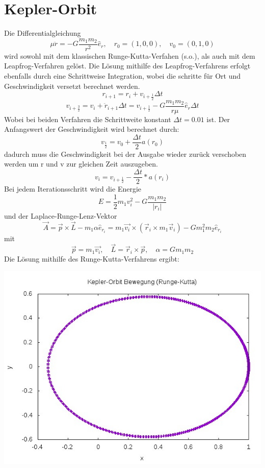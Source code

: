 \documentclass{scrreprt}
\begin{document}
\section*{Kepler-Orbit}
Die Differentialgleichung
\[
\mu \ddot{r}=-G\frac{m_1 m_2}{r^2}\hat{e}_r, \quad r_0 = (1,0,0), \quad v_0 = (0,1,0)
\]
wird sowohl mit dem klassischen Runge-Kutta-Verfahen (s.o.), als auch mit dem Leapfrog-Verfahren gelöst. Die Lösung mithilfe des Leapfrog-Verfahrens erfolgt ebenfalls durch eine Schrittweise Integration, wobei die schritte für Ort und Geschwindigkeit versetzt berechnet werden.
\[
r_{i+1} = r_i + {v}_{i+\frac{1}{2}} \Delta t
\]
\[
v_{i+\frac{3}{2}} = v_i + \ddot{r}_{i+1} \Delta t = v_{i+\frac{1}{2}} - G\frac{m_1 m_2}{r  \mu}\hat{e}_r\Delta t
\]
Wobei bei beiden Verfahren die Schrittweite konstant $\Delta t=0.01$ ist.
Der Anfangswert der Geschwindigkeit wird berechnet durch:
\[
v_{\frac{1}{2}}=v_0+\frac{\Delta t}{2} a(r_0)
\]
dadurch muss die Geschwindigkeit bei der Ausgabe wieder zurück verschoben werden um r und v zur gleichen Zeit auszugeben.
\[
v_i = v_{i+\frac{1}{2}}-\frac{\Delta t}{2}*a(r_i)
\]
Bei jedem Iterationsschritt wird die Energie 
\[
E = \frac{1}{2} m_1 v_i^2 -G\frac{m_1 m_2}{\vert r_i\vert}
\]
und der Laplace-Runge-Lenz-Vektor
\[
\vec{A} = \vec{p} \times \vec{L} - m_1 \alpha \hat{e}_{r_i}=m_1\vec{v_i}\times(\vec{r}_i \times m_1\vec{v}_i) - G m_1^2 m_2 \hat{e}_{r_i}
\]
mit
\[
\vec{p}=m_1 \vec{v_i}, \quad \vec{L}=\vec{r}_i \times \vec{p}, \quad \alpha=G m_1 m_2
\]
Die Lösung mithilfe des Runge-Kutta-Verfahrens ergibt:
\begin{center}
	\includegraphics*[scale=0.7]{2_runge_kutta_bewegung.jpeg}
\end{center}
\end{document}
